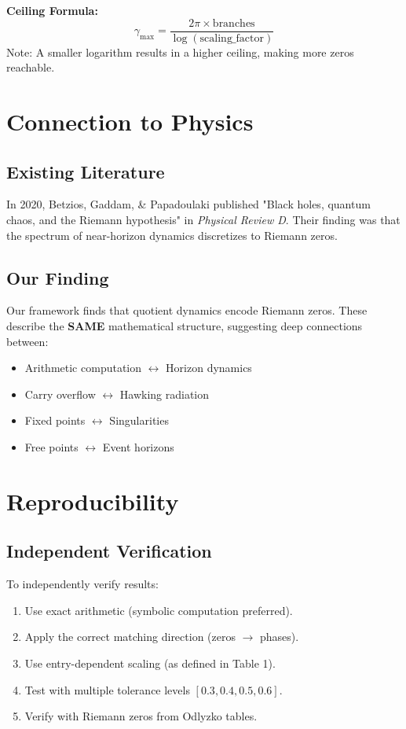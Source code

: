 \documentclass[11pt, a4paper]{article}
\begin{document}
\textbf{Ceiling Formula:}
\[ \gamma_{\max} = \frac{2\pi \times \text{branches}}{\log(\text{scaling\_factor})} \]
Note: A smaller logarithm results in a higher ceiling, making more zeros reachable.

\section{Connection to Physics}

\subsection{Existing Literature}
In 2020, Betzios, Gaddam, & Papadoulaki published "Black holes, quantum chaos, and the Riemann hypothesis" in \textit{Physical Review D}. Their finding was that the spectrum of near-horizon dynamics discretizes to Riemann zeros.

\subsection{Our Finding}
Our framework finds that quotient dynamics encode Riemann zeros. These describe the \textbf{SAME} mathematical structure, suggesting deep connections between:
\begin{itemize}
    \item Arithmetic computation $\leftrightarrow$ Horizon dynamics
    \item Carry overflow $\leftrightarrow$ Hawking radiation
    \item Fixed points $\leftrightarrow$ Singularities
    \item Free points $\leftrightarrow$ Event horizons
\end{itemize}

\section{Reproducibility}

\subsection{Independent Verification}
To independently verify results:
\begin{enumerate}
    \item Use exact arithmetic (symbolic computation preferred).
    \item Apply the correct matching direction (zeros $\to$ phases).
    \item Use entry-dependent scaling (as defined in Table 1).
    \item Test with multiple tolerance levels $[0.3, 0.4, 0.5, 0.6]$.
    \item Verify with Riemann zeros from Odlyzko tables.
\end{enumerate}
\end{document}
